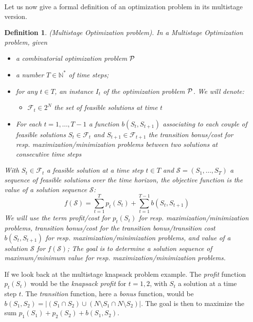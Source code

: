 \documentclass[a4paper]{book}
\newtheorem{definition}{Definition}
\begin{document}
Let us now give a formal definition of an optimization problem in its multistage version. 
\begin{definition}{\emph{(Multistage Optimization problem).}} In a Multistage Optimization problem, given 
\begin{itemize}
\item a combinatorial optimization problem $\cal P$ 
\item a number $T \in \mathbb{N}^*$ of time steps;
\item for any $t \in T$, an instance $I_t$ of the optimization problem $\cal P$. We will denote:
\begin{itemize}

\item $\mathcal{F}_t\in 2^N$ the set of feasible solutions at time $t$
\end{itemize} 

\item For each $t=1, \ldots, T-1$ a function $b(S_t,S_{t+1})$ associating to each couple of feasible solutions $S_t \in \mathcal{F}_t$ and $S_{t+1} \in \mathcal{F}_{t+1}$ the transition bonus/cost for resp. maximization/minimization problems between two solutions at consecutive time steps 
\end{itemize}
With $S_t \in \mathcal{F}_t$ a feasible solution at a time step $t \in T$ and $\mathcal{S}=(S_1,\dots,S_T)$ a sequence of feasible solutions over the time horizon, the objective function is the value of a solution sequence $\mathcal{S}$: $$f(\mathcal{S})=\sum_{t=1}^T p_t(S_t) + \sum_{t=1}^{T-1} b(S_t,S_{t+1})$$
We will use the term {\it profit}/cost for $ p_t(S_t)$ for resp. maximization/minimization problems, transition {\it bonus}/cost for the transition bonus/transition cost $b(S_t,S_{t+1})$ for resp. maximization/minimization problems, and {\it value} of a solution $\mathcal{S}$ for $f(\mathcal{S})$;
The goal is to determine a solution sequence of maximum/minimum value for resp. maximization/minimization problems. 

\end{definition}

If we look back at the {\sc multistage knapsack} problem example. The \textit{profit} function $p_t(S_t)$ would be the \textit{knapsack profit} for $t=1,2$, with $S_t$ a solution at a time step $t$. The \textit{transition} function, here a \textit{bonus} function, would be $b(S_1,S_{2})=|(S_1\cap S_2) \cup (N\setminus S_1 \cap N\setminus S_2)|$. The goal is then to maximize the sum $p_1(S_1)+p_2(S_2)+b(S_1,S_{2})$.
\end{document}
